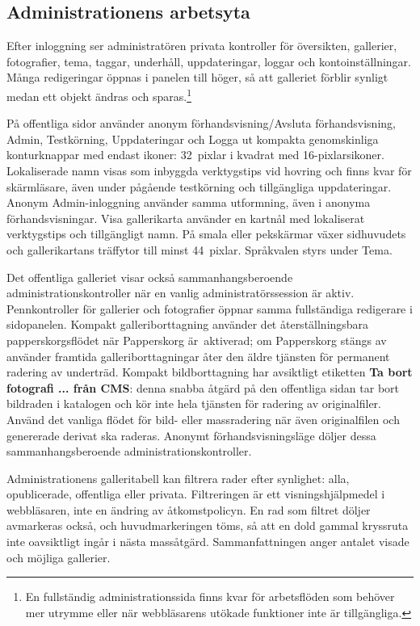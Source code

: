 \documentclass[11pt,a4paper]{article}
\newcommand{\ui}[1]{\textbf{#1}}
\begin{document}
\subsection{Administrationens arbetsyta}

Efter inloggning ser administratören privata kontroller för översikten,
gallerier, fotografier, tema, taggar, underhåll, uppdateringar, loggar och
kontoinställningar. Många redigeringar öppnas i panelen till höger, så att
galleriet förblir synligt medan ett objekt ändras och sparas.\footnote{En
fullständig administrationssida finns kvar för arbetsflöden som behöver mer
utrymme eller när webbläsarens utökade funktioner inte är tillgängliga.}

På offentliga sidor använder anonym förhandsvisning/Avsluta förhandsvisning,
Admin, Testkörning, Uppdateringar och Logga ut kompakta genomskinliga
konturknappar med endast ikoner: 32~pixlar i kvadrat med 16-pixlarsikoner.
Lokaliserade namn visas som inbyggda verktygstips vid hovring och finns kvar
för skärmläsare, även under pågående testkörning och tillgängliga uppdateringar.
Anonym Admin-inloggning använder samma utformning, även i anonyma
förhandsvisningar. Visa gallerikarta använder en kartnål med lokaliserat
verktygstips och tillgängligt namn. På smala eller pekskärmar växer sidhuvudets
och gallerikartans träffytor till minst 44~pixlar. Språkvalen styrs under Tema.

Det offentliga galleriet visar också sammanhangsberoende
administrationskontroller när en vanlig administratörssession är aktiv.
Pennkontroller för gallerier och fotografier öppnar samma fullständiga
redigerare i sidopanelen. Kompakt galleriborttagning använder det
återställningsbara papperskorgsflödet när Papperskorg är~aktiverad; om
Papperskorg stängs av använder framtida galleriborttagningar åter den äldre
tjänsten för permanent radering av underträd. Kompakt bildborttagning har
avsiktligt etiketten \ui{Ta bort fotografi ... från CMS}: denna snabba åtgärd på
den offentliga sidan tar bort bildraden i katalogen och kör inte hela tjänsten
för radering av originalfiler. Använd det vanliga flödet för bild- eller
massradering när även originalfilen och genererade derivat ska raderas. Anonymt
förhandsvisningsläge döljer dessa sammanhangsberoende administrationskontroller.

Administrationens galleritabell kan filtrera rader efter synlighet: alla,
opublicerade, offentliga eller privata. Filtreringen är ett visningshjälpmedel i
webbläsaren, inte en ändring av åtkomstpolicyn. En rad som filtret döljer
avmarkeras också, och huvudmarkeringen töms, så att en dold gammal kryssruta
inte oavsiktligt ingår i nästa massåtgärd. Sammanfattningen anger antalet visade
och möjliga gallerier.
\end{document}
